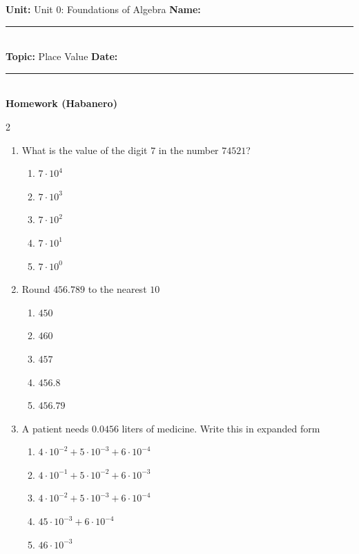 \documentclass[10pt]{article}
\begin{document}
\enlargethispage{2.5cm}

\begin{tcolorbox}[colback=mainblue!5, colframe=mainblue, sharp corners, boxrule=0.5pt]
    \small \textbf{Unit:} Unit 0: Foundations of Algebra \hfill \textbf{Name:} \rule{3cm}{0.4pt} \\
    \small \textbf{Topic:} Place Value \hfill \textbf{Date:} \rule{2cm}{0.4pt} \\
    \centering \textbf{\large Homework (Habanero)}
\end{tcolorbox}

\vspace{0.2cm}

\begin{multicols}{2}
\begin{enumerate}[label=\textbf{Q\arabic*.}, leftmargin=*, itemsep=6pt, parsep=0pt]

  \item \small What is the value of the digit $7$ in the number $74521$?
  \begin{enumerate}[label=(\Alph*), leftmargin=0.6cm, nosep, itemsep=2pt]
    \item $7 \cdot 10^4$
    \item $7 \cdot 10^3$
    \item $7 \cdot 10^2$
    \item $7 \cdot 10^1$
    \item $7 \cdot 10^0$
  \end{enumerate}

  \item \small Round $456.789$ to the nearest $10$
  \begin{enumerate}[label=(\Alph*), leftmargin=0.6cm, nosep, itemsep=2pt]
    \item $450$
    \item $460$
    \item $457$
    \item $456.8$
    \item $456.79$
  \end{enumerate}

  \item \small A patient needs $0.0456$ liters of medicine. Write this in expanded form
  \begin{enumerate}[label=(\Alph*), leftmargin=0.6cm, nosep, itemsep=2pt]
    \item $4 \cdot 10^{-2} + 5 \cdot 10^{-3} + 6 \cdot 10^{-4}$
    \item $4 \cdot 10^{-1} + 5 \cdot 10^{-2} + 6 \cdot 10^{-3}$
    \item $4 \cdot 10^{-2} + 5 \cdot 10^{-3} + 6 \cdot 10^{-4}$
    \item $45 \cdot 10^{-3} + 6 \cdot 10^{-4}$
    \item $46 \cdot 10^{-3}$
  \end{enumerate}


\end{enumerate}
\end{multicols}
\end{document}
